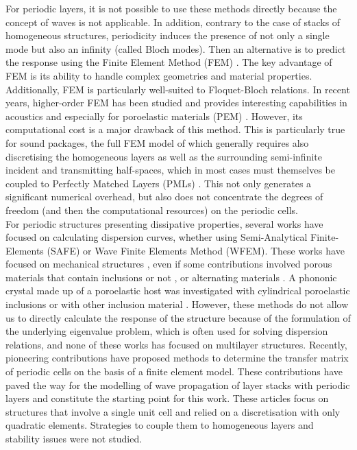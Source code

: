 For periodic layers, it is not possible to use these methods directly because the concept of waves is not applicable. In addition, contrary to the case of stacks of homogeneous structures, periodicity induces the presence of not only a single mode but also an infinity (called Bloch modes). Then an alternative is to predict the response using the Finite Element Method (FEM) \cite{petytIntroductionFiniteElement2010, geradinMechanicalVibrationsTheory2015,atalla2015}. The key advantage of FEM is its ability to handle complex geometries and material properties. Additionally, FEM is particularly well-suited to Floquet-Bloch relations. In recent years, higher-order FEM has been studied \cite{solin2004} and provides interesting capabilities in acoustics \cite{beriot2016,lieu2016} and especially for poroelastic materials (PEM) \cite{jonckheere2022}. However, its computational cost is a major drawback of this method. This is particularly true for sound packages, the full FEM model of which generally requires also discretising the homogeneous layers as well as the surrounding semi-infinite incident and transmitting half-spaces, which in most cases must themselves be coupled to Perfectly Matched Layers (PMLs) \cite{aberkane-gauthier2024, yangPredictionSoundAbsorption2022, kuznetsova2024,boulvert2020}. This not only generates a significant numerical overhead, but also does not concentrate the degrees of freedom (and then the computational resources) on the periodic cells. \\

For periodic structures presenting dissipative properties, several works have focused on calculating dispersion curves, whether using Semi-Analytical Finite-Elements (SAFE) or Wave Finite Elements Method (WFEM). These works have focused on mechanical structures \cite{colletFloquetBlochDecomposition2011, ichchouGuidedWavesGroup2007,rennoForcedResponseWaveguides2010,yangAnalysisVibroacousticCharacteristics2021}, even if some contributions involved porous materials that contain inclusions \cite{magliacano2020,magliacano2021} or not \cite{serraWavePropertiesPoroelastic2015}, or alternating materials \cite{wang2019}. A phononic crystal made up of a poroelastic host was investigated with cylindrical poroelastic inclusions \cite{wang2020} or with other inclusion material \cite{zhang2023}. However, these methods do not allow us to directly calculate the response of the structure because of the formulation of the underlying eigenvalue problem, which is often used for solving dispersion relations, and none of these works has focused on multilayer structures. Recently, pioneering contributions have proposed methods to determine the transfer matrix of periodic cells on the basis of a finite element model\cite{parrinelloGeneralizedTransferMatrix2020,parrinelloTransferMatrixRepresentation2016}. These contributions have paved the way for the modelling of wave propagation of layer stacks with periodic layers and constitute the starting point for this work. These articles focus on structures that involve a single unit cell and relied on a discretisation with only quadratic elements. Strategies to couple them to homogeneous layers and stability issues were not studied.\\ 

